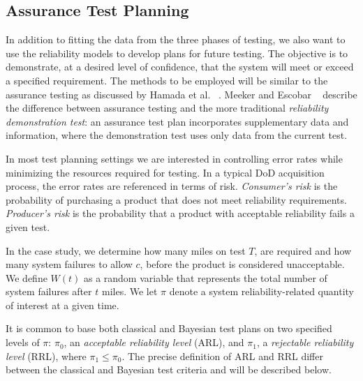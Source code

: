 \documentclass[12pt]{article}
\begin{document}
\subsection{Assurance Test Planning}\label{atp}
In addition to fitting the data from the three phases of testing, we also want to use the reliability models to
develop plans for future testing. The objective is to demonstrate, at a desired level of confidence, that the system will meet or exceed a specified requirement. The methods to be employed will be similar to the assurance testing
as discussed by Hamada et al. ~\cite{ref4}.
Meeker and Escobar
~\cite{ref7} describe the difference between assurance testing and the more traditional
\emph{reliability demonstration test}: an assurance
test plan incorporates supplementary data and information, where the demonstration test uses only data from the current test.

In most test planning settings we are interested in controlling error rates
while minimizing the resources required for testing.  In a typical DoD acquisition
process, the error rates are referenced in terms of risk. \emph{Consumer's
risk} is the probability of purchasing a product that does not meet
reliability requirements.  \emph{Producer's risk} is the probability that a
product with acceptable reliability fails a given test.

In the case study, we determine how many miles on test $T$, are required and how many system failures to allow $c$, before the product is considered unacceptable.  We define $W(t)$ as a random variable that represents the total number of system failures after $t$ miles.  We let $\pi$ denote a system reliability-related
quantity of interest at a given time.

It is common to base both classical and Bayesian test plans on two specified levels
of $\pi$: $\pi_0$, an \emph{acceptable reliability level} (ARL), and $\pi_1$, a
\emph{rejectable reliability level} (RRL), where $\pi_1 \leq  \pi_0$. The precise definition of ARL and RRL differ between the classical and Bayesian test criteria and will be described below.
\end{document}

